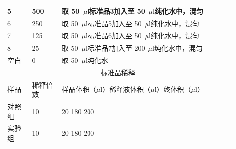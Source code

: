\documentclass[UTF8,10pt,a4paper,fontset=fandol]{ctexart}
\newcommand{\fieldvalue}[1]{#1}
\newcommand{\handwritten}[1]{#1}
\begin{document}
\begin{tabular}{|p{0.10\linewidth}|p{0.12\linewidth}|p{0.70\linewidth}|}
\hline
5 & 500 &
取
\fieldvalue{\handwritten{50}}
\,\(\mu\mathrm{l}\)标准品3加入至
\fieldvalue{\handwritten{50}}
\,\(\mu\mathrm{l}\)纯化水中，混匀
\\ \hline
6 & 250 &
取
\fieldvalue{\handwritten{50}}
\,\(\mu\mathrm{l}\)标准品5加入至
\fieldvalue{\handwritten{50}}
\,\(\mu\mathrm{l}\)纯化水中，混匀
\\ \hline
7 & 125 &
取
\fieldvalue{\handwritten{50}}
\,\(\mu\mathrm{l}\)标准品6加入至
\fieldvalue{\handwritten{50}}
\,\(\mu\mathrm{l}\)纯化水中，混匀
\\ \hline
8 & 25 &
取
\fieldvalue{\handwritten{50}}
\,\(\mu\mathrm{l}\)标准品7加入至
\fieldvalue{\handwritten{200}}
\,\(\mu\mathrm{l}\)纯化水中，混匀
\\ \hline
空白 & 0 &
取
\fieldvalue{\handwritten{50}}
\,\(\mu\mathrm{l}\)纯化水
\\ \hline
\multicolumn{3}{|c|}{标准品稀释} \\ \hline
样品 & 稀释倍数 & 样品体积（\(\mu\mathrm{l}\)）\quad 稀释液体积（\(\mu\mathrm{l}\)）\quad 终体积（\(\mu\mathrm{l}\)）
\\ \hline
对照组 &
\fieldvalue{\handwritten{10}}
&
\fieldvalue{\handwritten{20}}
\quad
\fieldvalue{\handwritten{180}}
\quad
\fieldvalue{\handwritten{200}}
\\ \hline
实验组 &
\fieldvalue{\handwritten{10}}
&
\fieldvalue{\handwritten{20}}
\quad
\fieldvalue{\handwritten{180}}
\quad
\fieldvalue{\handwritten{200}}
\\ \hline
\end{tabular}
\end{document}
